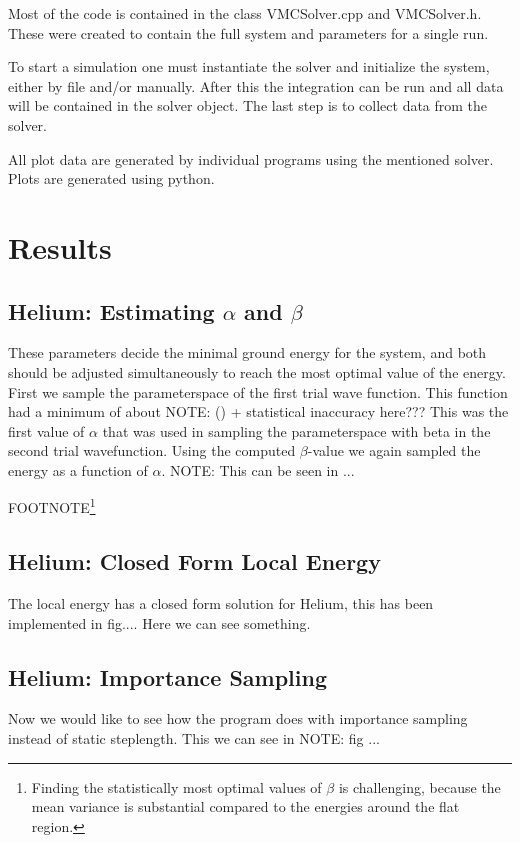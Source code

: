 \documentclass[twocolumn]{article}[10pt]
\begin{document}
Most of the code is contained in the class VMCSolver.cpp and VMCSolver.h. 
These were created to contain the full system and parameters for a single run. 

To start a simulation one must instantiate the solver and 
initialize the system, either by file and/or manually. After this
the integration can be run and all data will be contained in the solver object.
The last step is to collect data from the solver. 

All plot data are generated by individual programs using the mentioned solver. 
Plots are generated using python. 

\section{Results}
\subsection{Helium: Estimating $\alpha$ and $\beta$}
These parameters decide the minimal ground energy for the system, and both
should be adjusted simultaneously to reach the most optimal value of the
energy. First we sample the parameterspace of the first trial wave function. 
This function had a minimum of about NOTE: () + statistical inaccuracy here???
This was the first value of $\alpha$ that was used in sampling the 
parameterspace with beta in the second trial wavefunction. 
Using the computed $\beta$-value we again
sampled the energy as a function of $\alpha$. NOTE: This can be seen in ...

FOOTNOTE\footnote{Finding the statistically most optimal values of $\beta$ 
is challenging, because the mean variance is
substantial compared to the energies around the flat region.}   



\subsection{Helium: Closed Form Local Energy}
The local energy has a closed form solution for Helium, this has 
been implemented in fig.... Here we can see something. 

\subsection{Helium: Importance Sampling}
Now we would like to see how the program does with importance sampling instead 
of static steplength. This we can see in NOTE: fig ... 
\end{document}
